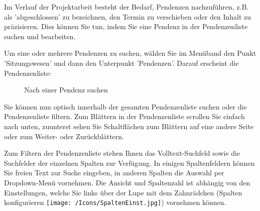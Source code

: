 Im Verlauf der Projektarbeit besteht der Bedarf, Pendenzen nachzuführen, z.B. als 'abgeschlossen' zu bezeichnen, den Termin zu verschieben oder den Inhalt zu präzisieren. Dies können Sie tun, indem Sie eine Pendenz in der Pendenzenliste suchen und bearbeiten.

\vspace{\baselineskip}

Um eine oder mehrere Pendenzen zu suchen, wählen Sie im Menüband den Punkt 'Sitzungswesen' und dann den Unterpunkt 'Pendenzen'. Darauf erscheint die Pendenzenliste:

\begin{figure}[H]
\caption{Nach einer Pendenz suchen}
\end{figure}

Sie können nun optisch innerhalb der gesamten Pendenzenliste suchen oder die Pendenzenliste filtern. Zum Blättern in der Pendenzenliste scrollen Sie einfach nach unten, zuunterst sehen Sie Schaltflächen zum Blättern auf eine andere Seite oder zum Weiter- oder Zurückblättern.

\begin{figure}[H]
\end{figure}

Zum Filtern der Pendenzenliste stehen Ihnen das Volltext-Suchfeld  sowie die Suchfelder der einzelnen Spalten  zur Verfügung. In einigen Spaltenfeldern können Sie freien Text zur Suche eingeben, in anderen Spalten die Auswahl per Dropdown-Menü vornehmen. Die Ansicht und Spaltenzahl ist abhängig von den Einstellungen, welche Sie links über der Lupe mit dem Zahnrädchen (Spalten konfigurieren \texttt{[image: /Icons/SpaltenEinst.jpg]}) vornehmen können.

\vspace{\baselineskip}

